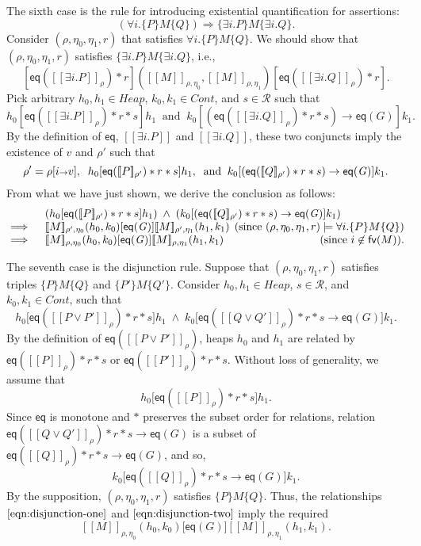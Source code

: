 \documentclass{LMCS}
\newcommand{\Heap}{\mathit{Heap}}
\newcommand{\Good}{\mathit{G}}
\newcommand{\cR}{\mathcal{R}}
\newcommand{\cont}{\mathit{Cont}}
\newcommand{\FV}{\mathsf{fv}}
\newcommand{\bind}{{\scriptstyle\relax\rightarrow}}
\newcommand{\ff}[1]{[\![#1]\!]}
\newcommand{\mtri}[3]{\{{#1}\}{#2}\{{#3}\}}
\newcommand{\squad}[4]{{[{#1}]}
                        ({#2},  {#3})
                       {[{#4}]}}
\newcommand{\EQ}{\mathsf{eq}}
\begin{document}
The sixth case is the rule for introducing
existential quantification for assertions:
$$
(\forall i. \mtri{P}{M}{Q})
 \Rightarrow \mtri{\exists i.P}{M}{\exists i.Q}.
$$
Consider $(\rho,\eta_0,\eta_1,r)$ that satisfies
$\forall i. \mtri{P}{M}{Q}$.  We should show that 
$(\rho,\eta_0,\eta_1,r)$  
satisfies $\mtri{\exists i.P}{M}{\exists i.Q}$, i.e.,
$$
   \squad
     {\EQ(\ff{\exists i.P}_\rho)*r}
     {\ff{M}_{\rho,\eta_0}}
     {\ff{M}_{\rho,\eta_1}}
     {\EQ(\ff{\exists i.Q}_\rho)*r}.
$$
Pick arbitrary $h_0,h_1 \in \Heap$, $k_0,k_1 \in \cont$,
and $s \in\cR$ such that 
$$
   h_0[\EQ(\ff{\exists i.P}_\rho)*r*s]h_1
   \;\;\mbox{and}\;\;
   k_0[(\EQ(\ff{\exists i.Q}_\rho)*r*s) \rightarrow \EQ(\Good)]k_1.
$$
By the definition of $\EQ$, $\ff{\exists i.P}$ and 
$\ff{\exists i.Q}$, these two conjuncts imply the
existence of $v$ and $\rho'$ such that
$$
   \rho' = \rho[i\bind v],\;\;
   h_0[\EQ(\ff{P}_{\rho'})*r*s]h_1,\;\;
   \mbox{and}\;\;
   k_0[(\EQ(\ff{Q}_{\rho'})*r*s) \rightarrow \EQ(\Good)]k_1.
$$
From what we have just shown, we derive the conclusion 
as follows:
$$
\begin{array}{@{}rl@{}}
&
   (h_0[\EQ(\ff{P}_{\rho'})*r*s]h_1)
   \;\wedge\;
   (k_0[(\EQ(\ff{Q}_{\rho'})*r*s) \rightarrow \EQ(\Good)]k_1)
\\
\implies\;
&
   \ff{M}_{\rho',\eta_0}(h_0,k_0)[\EQ(\Good)]
   \ff{M}_{\rho',\eta_1}(h_1,k_1)
\;\,\hfill
   (\mbox{since }
    (\rho,\eta_0,\eta_1,r) \models \forall i.\mtri{P}{M}{Q})
\\
\implies\;
&
   \ff{M}_{\rho,\eta_0}(h_0,k_0)[\EQ(\Good)]
   \ff{M}_{\rho,\eta_1}(h_1,k_1)
\quad\hfill
   (\mbox{since } i \not\in \FV(M)).
\end{array}
$$

The seventh case is the disjunction rule. Suppose
that $(\rho,\eta_0,\eta_1,r)$ satisfies triples
$\mtri{P}{M}{Q}$ and $\mtri{P'}{M}{Q'}$. 
Consider
$h_0,h_1 \in \Heap$, $s \in \cR$,
and $k_0,k_1 \in \cont$, such that
$$
   h_0\bigl[\EQ(\ff{P\vee P'}_\rho)*r*s\bigr]h_1\;\wedge\;
   k_0\bigl[\EQ(\ff{Q \vee Q'}_\rho)*r*s \rightarrow 
             \EQ(\Good)\bigr]k_1.
$$
By the definition of $\EQ(\ff{P\vee P'}_\rho)$, 
heaps $h_0$ and $h_1$ are related by
$\EQ(\ff{P}_\rho)*r*s$ or $\EQ(\ff{P'}_\rho)*r*s$.
Without loss of generality, we assume that
\begin{equation}\label{eqn:disjunction-one}
h_0\bigl[\EQ(\ff{P}_\rho)*r*s\bigr]h_1.
\end{equation}
Since $\EQ$ is monotone and $*$ preserves the 
subset order for relations,
relation $\EQ(\ff{Q \vee Q'}_\rho)*r*s \rightarrow \EQ(\Good)$
is a subset of $\EQ(\ff{Q}_\rho)*r*s \rightarrow \EQ(\Good)$,
and so,
\begin{equation}\label{eqn:disjunction-two}
k_0\bigl[\EQ(\ff{Q}_\rho)*r*s \rightarrow \EQ(\Good)\bigr]k_1.
\end{equation}
By the supposition, $(\rho,\eta_0,\eta_1,r)$ satisfies
$\mtri{P}{M}{Q}$. Thus, the relationships $\ref{eqn:disjunction-one}$
and $\ref{eqn:disjunction-two}$ imply the required
$$
  \ff{M}_{\rho,\eta_0}(h_0,k_0)
  \bigl[\EQ(\Good)\bigr]
  \ff{M}_{\rho,\eta_1}(h_1,k_1).
$$
\end{document}
